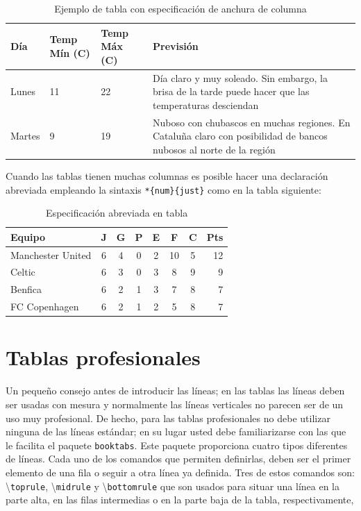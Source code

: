\documentclass[ 		%
	11pt,				%
	a4paper,			%
	twoside,			%
	openright,			%
	final       		%
]{book}
\begin{document}
\begin{table}[H]%
	\centering
	\caption{Ejemplo de tabla con especificación de anchura de columna}
	\label{tab:anchura}
	\begin{tabular}{ | l | l | l | p{5cm} |}
	\hline
	Día & Temp Mín (\textdegree C) & Temp Máx (\textdegree C) & Previsión \\ \hline
	Lunes & 11 & 22 & Día claro y muy soleado. Sin embargo, la brisa de la tarde puede hacer que las temperaturas desciendan \\ \hline
	Martes & 9 & 19 & Nuboso con chubascos en muchas regiones. En Cataluña claro con posibilidad de bancos nubosos al norte de la región \\ 
    \hline
	\end{tabular}
\end{table}

Cuando las tablas tienen muchas columnas es posible hacer una declaración abreviada empleando la sintaxis \texttt{*\{num\}\{just\}} como en la tabla siguiente:

\begin{table}[H]%
	\centering
	\caption{Especificación abreviada en tabla}
	\label{tab:abreviada}
	\begin{tabular}{l*{6}{c}|r}
	Equipo            & J & G & P & E & F  & C & Pts \\
	\hline
	Manchester United & 6 & 4 & 0 & 2 & 10 & 5 & 12  \\
	Celtic            & 6 & 3 & 0 & 3 &  8 & 9 &  9  \\
	Benfica           & 6 & 2 & 1 & 3 &  7 & 8 &  7  \\
	FC Copenhagen     & 6 & 2 & 1 & 2 &  5 & 8 &  7  \\
	\end{tabular}
\end{table}









\section{Tablas profesionales}
Un pequeño consejo antes de introducir las líneas; en las tablas las líneas deben ser usadas con mesura y normalmente las líneas verticales no parecen ser de un uso muy profesional. De hecho, para las tablas profesionales no debe utilizar ninguna de las líneas estándar; en su lugar usted debe familiarizarse con las que le facilita el paquete \texttt{booktabs}. Este paquete proporciona cuatro tipos diferentes de líneas. Cada uno de los comandos que permiten definirlas, deben ser el primer elemento de una fila o seguir a otra línea ya definida. Tres de estos comandos son: \textbackslash \texttt{toprule}, \textbackslash \texttt{midrule} y \textbackslash \texttt{bottomrule} que son usados para situar una línea en la parte alta, en las filas intermedias o en la parte baja de la tabla, respectivamente, 
\end{document}
